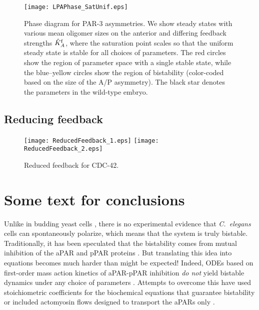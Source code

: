 \documentclass[11pt]{article}
\newcommand{\6}[1]{#1_{\text{6}}}
\newcommand{\3}[1]{#1_{\text{3}}}
\begin{document}
\begin{figure}
\centering
\texttt{[image: LPAPhase\_SatUnif.eps]}
\caption{\label{fig:PhaseDiagram}Phase diagram for PAR-3 asymmetries. We show steady states with various mean oligomer sizes on the anterior and differing feedback strengths $\hat{K}^\text{f}_A$, where the saturation point scales so that the uniform steady state is stable for all choices of parameters. The red circles show the region of parameter space with a single stable state, while the blue--yellow circles show the region of bistability (color-coded based on the size of the A/P asymmetry). The black star denotes the parameters in the wild-type embryo. }
\end{figure}

\subsection{Reducing feedback}
\begin{figure}
\centering
\texttt{[image: ReducedFeedback\_1.eps]}
\texttt{[image: ReducedFeedback\_2.eps]}
\caption{\label{fig:FBReduce}Reduced feedback for CDC-42.}
\end{figure}

\section{Some text for conclusions}
Unlike in budding yeast cells \cite{mogilner2012cell}, there is no experimental evidence that \emph{C.\ elegans} cells can spontaneously polarize, which means that the system is truly bistable. Traditionally, it has been speculated that the bistability comes from mutual inhibition of the aPAR and pPAR proteins \cite{halatek2018self, trong2014parameter}. But translating this idea into equations becomes much harder than might be expected! Indeed, ODEs based on first-order mass action kinetics of aPAR-pPAR inhibition \emph{do not} yield bistable dynamics under any choice of parameters \cite{dawes20113}. Attempts to overcome this have used stoichiometric coefficients for the biochemical equations that guarantee bistability \cite{goehring2011polarization, gross2019guiding} or included actomyosin flows designed to transport the aPARs only \cite{TH2008}.
\end{document}
